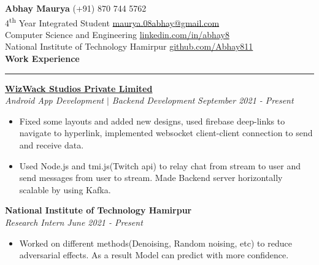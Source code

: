 \documentclass[11pt]{article}
\author{Abhay Maurya}
\begin{document}
	\LARGE{\textbf{Abhay Maurya}}
	\small
	\hfill
        (+91) 870 744 5762 \\
    4\textsuperscript{th} Year Integrated Student
    \hfill
        \href{mailto:maurya.08abhay@gmail.com}{\color{blue}maurya.08abhay@gmail.com}\\
    \hfill
        Computer Science and Engineering
    \hfill
        \href{https://www.linkedin.com/in/abhay8/}{\color{blue}linkedin.com/in/abhay8}\\
    \hfill
    National Institute of Technology Hamirpur
    \hfill
     	\href{https://github.com/Abhay811}{\color{blue}github.com/Abhay811}\\
    
    \vspace{4pt}
    \textbf{\large{Work Experience}}
    	\vspace{5pt}
    	\hrule
    	\vspace{4pt}
    	\href{https://drive.google.com/file/d/1GKUMLnI26wRim3qdr-GsE-1DidYjr17D/view?usp=sharing}{\textbf{WizWack Studios Private Limited}}
    	\hfill
    	\\
    	\textit{Android App Development $|$ Backend Development}
    	\hfill
    	\textit{September 2021 - Present}
    	\vspace{-6pt}
    	\begin{itemize}
    		\setlength{\itemsep}{0pt}
        	\setlength{\parskip}{0pt}
        	\setlength{\parsep}{0pt}
    		\item Fixed some layouts and added new designs, used firebase deep-links to navigate to hyperlink, implemented websocket client-client connection to send and receive data.
    		\item Used Node.js and tmi.js(Twitch api) to relay chat from stream to user and send messages from user to stream. Made Backend server horizontally scalable by using Kafka. 
    	\end{itemize}
    	\textbf{National Institute of Technology Hamirpur}
    	\hfill
    	\\
    	\textit{Research Intern}
    	\hfill
    	\textit{June 2021 - Present}
    	\vspace{-6pt}
    	\begin{itemize}
    		\setlength{\itemsep}{0pt}
    		\setlength{\parskip}{0pt}
    		\setlength{\parsep}{0pt}
    		\item Worked on different methods(Denoising, Random noising, etc) to reduce adversarial effects. As a result Model can predict with more confidence.
    	\end{itemize}
\end{document}
